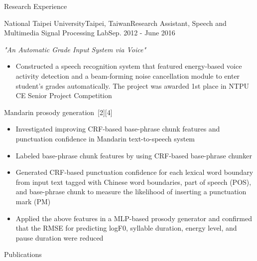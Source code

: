 \documentclass{resume_short} %
\begin{document}
\begin{rSection}{Research Experience}
\begin{rSubsection}{National Taipei University}{Taipei, Taiwan}{Research Assistant, Speech and Multimedia Signal Processing Lab}{Sep. 2012 - June 2016}
        \item {\em "An Automatic Grade Input System via Voice"}
        \begin{itemize}[label=$-$]
            \setlength \itemsep{-0.5em}
            \item Constructed a speech recognition system that featured energy-based voice activity detection and a beam-forming noise cancellation module to enter student’s grades automatically. The project was awarded 1st place in NTPU CE Senior Project Competition
        \end{itemize}\vspace{0.5em}
        \item Mandarin prosody generation~[2][4]
        \begin{itemize}[label=$-$]
            \setlength \itemsep{-0.5em}
            \item Investigated improving CRF-based base-phrase chunk features and punctuation confidence in Mandarin text-to-speech system
            \item Labeled base-phrase chunk features by using CRF-based base-phrase chunker
            \item Generated CRF-based punctuation confidence for each lexical word boundary from input text tagged with Chinese word boundaries, 
                  part of speech (POS), and base-phrase chunk to measure the likelihood of inserting a punctuation mark (PM)
            \item Applied the above features in a MLP-based prosody generator and confirmed that the RMSE for predicting logF0, syllable duration, energy level, and pause duration were reduced
        \end{itemize}\vspace{0.5em}
    \end{rSubsection}
\end{rSection}

\begin{rSection}{Publications}
    
    
    \begin{enumerate}[label={[\arabic*]}]
    \item {}
    \item {}
    \item {}
    \item {}
    \end{enumerate}    
\end{rSection}
\end{document}
